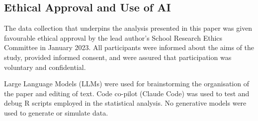 \documentclass[
  12pt,
  letterpaper,
  DIV=11,
  numbers=noendperiod]{scrartcl}
\theoremstyle{plain}
\theoremstyle{definition}
\begin{document}
\begin{table}

\caption{\label{tbl-sample-characteristics}RDS Sample Characteristics by
Nationality Cluster and Recruitment Wave. Source: Authors' Own Work.}


\end{table}%

\subsection{Ethical Approval and Use of
AI}\label{ethical-approval-and-use-of-ai}

The data collection that underpins the analysis presented in this paper
was given favourable ethical approval by the lead author's School
Research Ethics Committee in January 2023. All participants were
informed about the aims of the study, provided informed consent, and
were assured that participation was voluntary and confidential.

Large Language Models (LLMs) were used for brainstorming the
organisation of the paper and editing of text. Code co-pilot (Claude
Code) was used to test and debug R scripts employed in the statistical
analysis. No generative models were used to generate or simulate data.
\end{document}
